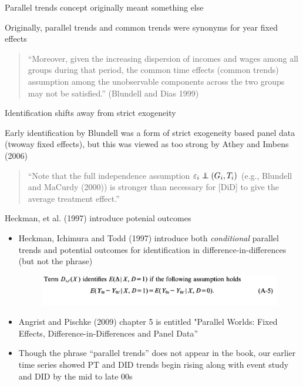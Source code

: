 \documentclass{beamer}
\newcommand\independent{\protect\mathpalette{\protect\independenT}{\perp}}
\def\independenT#1#2{\mathrel{\rlap{$#1#2$}\mkern2mu{#1#2}}}
\begin{document}
\begin{frame}{Parallel trends concept originally meant something else}


 Originally, parallel trends and common trends were synonyms for year fixed effects 
 
 \bigskip
 
	\begin{quote}
	“Moreover, given the increasing dispersion of incomes and wages among all groups during that period, the common time effects (common trends) assumption among the unobservable components across the two groups may not be satisfied.” (Blundell and Dias 1999)
	\end{quote}


\end{frame}

\begin{frame}{Identification shifts away from strict exogeneity}


 Early identification by Blundell was a form of strict exogeneity based panel data (twoway fixed effects), but this was viewed as too strong by Athey and Imbens (2006) 
 
 \bigskip

\begin{quote}
“Note that the full independence assumption $\varepsilon_i \independent(G_i,T_i)$ (e.g., Blundell and MaCurdy (2000)) is stronger than necessary for [DiD] to give the average treatment effect.”
\end{quote}


\end{frame}



\begin{frame}{Heckman, et al. (1997) introduce potenial outcomes}


\begin{itemize}
\item Heckman, Ichimura and Todd (1997) introduce both \emph{conditional} parallel trends and potential outcomes for identification in difference-in-differences (but not the phrase)

\bigskip

	\begin{figure}
	\includegraphics[scale=0.2]{./lecture_includes/heckman_cpt}
	\end{figure}


\item Angrist and Pischke (2009) chapter 5 is entitled "Parallel Worlds: Fixed Effects, Difference-in-Differences and Panel Data''
\item Though the phrase ``parallel trends'' does not appear in the book, our earlier time series showed PT and DID trends begin rising along with event study and DID by the mid to late 00s
\end{itemize}


\end{frame}
\end{document}
